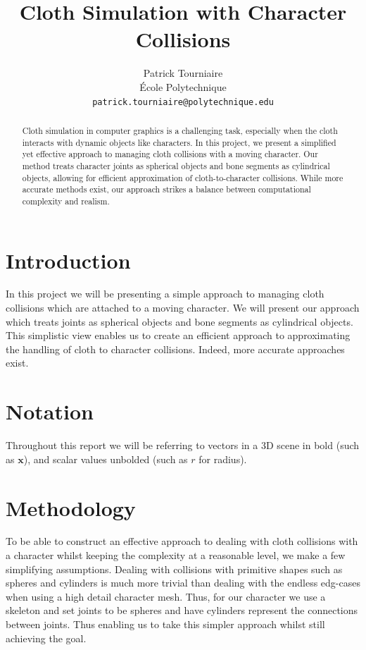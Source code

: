 \documentclass{article}
\title{Cloth Simulation with Character Collisions}
\author{%
  Patrick Tourniaire \\
  École Polytechnique \\
  \texttt{patrick.tourniaire@polytechnique.edu}
}
\begin{document}
\maketitle


\begin{abstract}
  Cloth simulation in computer graphics is a challenging task, especially when the cloth interacts with dynamic 
  objects like characters. In this project, we present a simplified yet effective approach to managing cloth 
  collisions with a moving character. Our method treats character joints as spherical objects and bone segments 
  as cylindrical objects, allowing for efficient approximation of cloth-to-character collisions. While more 
  accurate methods exist, our approach strikes a balance between computational complexity and realism.
\end{abstract}


\section{Introduction}

In this project we will be presenting a simple approach to managing cloth collisions which are attached to a
moving character. We will present our approach which treats joints as spherical objects and bone segments as
cylindrical objects. This simplistic view enables us to create an efficient approach to approximating the handling
of cloth to character collisions. Indeed, more accurate approaches exist.


\section{Notation}

Throughout this report we will be referring to vectors in a 3D scene in bold (such as $\mathbf{x}$), and 
scalar values unbolded (such as $r$ for radius).

\section{Methodology}

To be able to construct an effective approach to dealing with cloth collisions with a character
whilst keeping the complexity at a reasonable level, we make a few simplifying assumptions. Dealing
with collisions with primitive shapes such as spheres and cylinders is much more trivial than dealing with
the endless edg-cases when using a high detail character mesh. Thus, for our character we use a skeleton
and set joints to be spheres and have cylinders represent the connections between joints. Thus enabling
us to take this simpler approach whilst still achieving the goal. 
\end{document}
